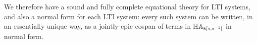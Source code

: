 %

We therefore have a sound and fully complete equational theory for LTI systems,
and also a normal form for each LTI system: every such system can be written, in
an essentially unique way, as a jointly-epic cospan of terms in $\mathbb{HA}_{\mathsf{k}[s,s^{-1}]}$ in
normal form.

